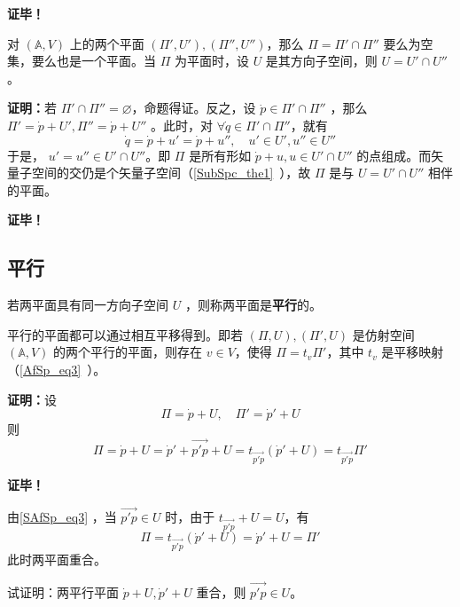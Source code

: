 \textbf{证毕！}
\begin{corollary}{}
对 $(\mathbb A,V)$ 上的两个平面 $(\Pi',U'),(\Pi'',U'')$，那么 $\Pi=\Pi'\cap\Pi''$ 要么为空集，要么也是一个平面。当 $\Pi$ 为平面时，设 $U$ 是其方向子空间，则 $U=U'\cap U''$。
\end{corollary}
\textbf{证明：}若 $\Pi'\cap\Pi''=\varnothing$，命题得证。反之，设 $\dot p\in \Pi'\cap\Pi''$ ，那么 $\Pi'=\dot p+U',\Pi''=\dot p+U''$ 。此时，对 $\forall\dot q\in\Pi'\cap\Pi''$，就有 \begin{equation}
\dot q=\dot p+u'=\dot p+u'',\quad u'\in U',u''\in U''
\end{equation}
于是， $u'=u''\in U'\cap U''$。即 $\Pi$ 是所有形如 $\dot p+u,u\in U'\cap U''$ 的点组成。而矢量子空间的交仍是个矢量子空间（\autoref{SubSpc_the1}~），故 $\Pi$ 是与 $U=U'\cap U''$ 相伴的平面。

\textbf{证毕！}
\subsection{平行}

\begin{definition}{}
若两平面具有同一方向子空间 $U$ ，则称两平面是\textbf{平行}的。
\end{definition}
\begin{theorem}{}
平行的平面都可以通过相互平移得到。即若 $(\Pi,U),(\Pi',U)$ 是仿射空间 $(\mathbb A,V)$ 的两个平行的平面，则存在 $v\in V$，使得 $\Pi=t_{v}\Pi'$，其中 $t_v$ 是平移映射（\autoref{AfSp_eq3}~）。
\end{theorem}
\textbf{证明：}设
\begin{equation}
\Pi=\dot p+U,\quad \Pi'=\dot p'+U
\end{equation}
则
\begin{equation}\label{SAfSp_eq3}
\Pi=\dot p+U=\dot p'+\overrightarrow{p'p}+U=t_{\overrightarrow{p'p}}(\dot p'+U)=t_{\overrightarrow{p'p}} \Pi'
\end{equation}

\textbf{证毕！}

由\autoref{SAfSp_eq3} ，当 $\overrightarrow{p'p}\in U$ 时，由于 $t_{\overrightarrow{p'p}}+U=U$，有
\begin{equation}
\Pi=t_{\overrightarrow{p'p}}(\dot p'+U)=\dot p'+U=\Pi'
\end{equation}
此时两平面重合。
\begin{exercise}{}
试证明：两平行平面 $\dot p+U,\dot p'+U$ 重合，则 $\overrightarrow{p'p}\in U$。
\end{exercise}